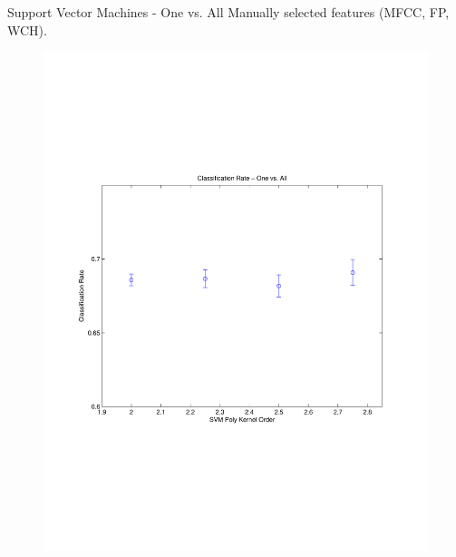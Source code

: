 \documentclass[xcolor=dvipsnames,t]{beamer} %
\begin{document}
\begin{frame}{Support Vector Machines - One vs. All}
   Manually selected features (MFCC, FP, WCH).
   ~\\[-9em]
   \begin{figure}
      \centering
      \includegraphics[width=\textwidth]{figures/optimSVMOVAOrder_WCH.pdf}
   \end{figure}
\end{frame}
\end{document}
